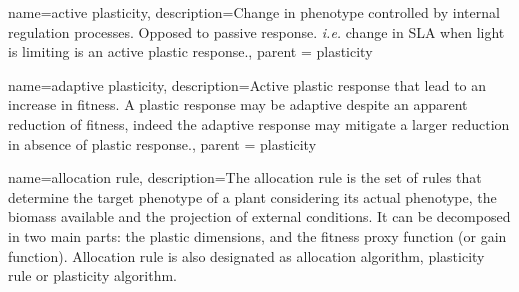 
{
    name=active plasticity,
    description={Change in phenotype controlled by internal regulation processes. Opposed to passive response. \textit{i.e.} change in SLA when light is limiting is an active plastic response.},
    parent = plasticity
    }


{
    name=adaptive plasticity,
    description={Active plastic response that lead to an increase in fitness. A plastic response may be adaptive despite an apparent reduction of fitness, indeed the adaptive response may mitigate a larger reduction in absence of plastic response.},
    parent = plasticity
    }

%

{
    name=allocation rule,
    description={The allocation rule is the set of rules that determine the target phenotype of a plant considering its actual phenotype, the biomass available and the projection of external conditions. It can be decomposed in two main parts: the plastic dimensions, and the fitness proxy function (or gain function). Allocation rule is also designated as allocation algorithm, plasticity rule or plasticity algorithm.}
}

